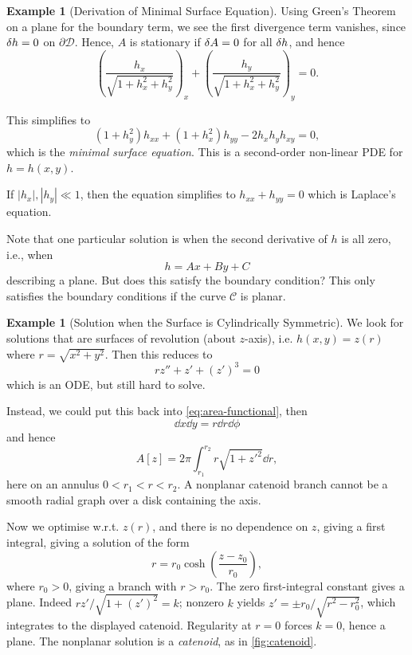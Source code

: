 \documentclass[11pt]{article}
\numberwithin{equation}{section}
\theoremstyle{definition}
\newtheorem{example}[theorem]{Example}
\theoremstyle{remark}
\newcommand{\pqty}[1]{\left(#1\right)}
\newcommand{\bqty}[1]{\left[#1\right]}
\newcommand{\abs}[1]{\left|#1\right|}
\begin{document}
\begin{example}[Derivation of Minimal Surface Equation]
    Using Green's Theorem on a plane for the boundary term, we see the first divergence term vanishes, since \(\var{h} = 0\) on \(\partial \mathcal{D}\). Hence, \(A\) is stationary if \(\var{A}=0\) for all \(\var{h}\), and hence
    \[
        \pqty{\frac{h_x}{\sqrt{1 + h_x^2 + h_y^2}}}_x + \pqty{\frac{h_y}{\sqrt{1 + h_x^2 + h_y^2}}}_y = 0.
    \]

    This simplifies to
    \[
        \pqty{1 + h_y^2} h_{xx} + \pqty{1 + h_x^2} h_{yy} - 2 h_x h_y h_{xy} = 0,
    \]
    which is the \emph{minimal surface equation}. This is a second-order non-linear PDE for \(h = h\pqty{x, y}\).
\end{example}

If \(\abs{h_x}, \abs{h_y} \ll 1\), then the equation simplifies to \(h_{xx} + h_{yy} = 0\) which is Laplace's equation.

Note that one particular solution is when the second derivative of \(h\) is all zero, i.e., when
\[
    h = Ax + By + C
\]
describing a plane. But does this satisfy the boundary condition? This only satisfies the boundary conditions if the curve \(\mathcal{C}\) is planar.

\begin{example}[Solution when the Surface is Cylindrically Symmetric]\label{variation-unit-0086}
    We look for solutions that are surfaces of revolution (about \(z\)-axis), i.e. \(h\pqty{x, y} = z\pqty{r}\) where \(r = \sqrt{x^2 + y^2}\). Then this reduces to
    \[
        r z'' + z' + \pqty{z'}^3 = 0
    \]
    which is an ODE, but still hard to solve.
    
    Instead, we could put this back into \autoref{eq:area-functional}, then
    \[
        \dd{x} \dd{y} = r \dd{r} \dd{\phi}
    \]
    and hence
    \[
        A\bqty{z} = 2 \pi \int_{r_1}^{r_2} r \sqrt{1 + z'^2} \dd{r},
    \]
    here on an annulus \(0<r_1<r<r_2\). A nonplanar catenoid branch cannot be a smooth radial graph over a disk containing the axis.
    
    Now we optimise w.r.t. \(z\pqty{r}\), and there is no dependence on \(z\), giving a first integral, giving a solution of the form
    \[
        r = r_0 \cosh \pqty{\frac{z - z_0}{r_0}},
    \]
    where \(r_0>0\), giving a branch with \(r>r_0\). The zero first-integral constant gives a plane. Indeed \(rz\prime/\sqrt{1+(z\prime)^2}=k\); nonzero \(k\) yields \(z\prime=\pm r_0/\sqrt{r^2-r_0^2}\), which integrates to the displayed catenoid. Regularity at \(r=0\) forces \(k=0\), hence a plane. The nonplanar solution is a \emph{catenoid}, as in \autoref{fig:catenoid}.
\end{example}
\end{document}
